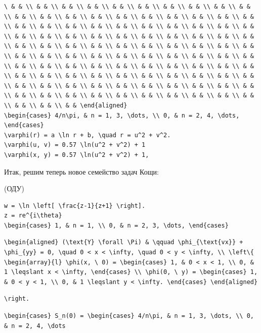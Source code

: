 \documentclass[
  ukrainian,
]{article}
\begin{document}
\begin{verbatim}
\ & & \\ & & \\ & & \\ & & \\ & & \\ & & \\ & & \\ & & \\ & & \\ & & \\ & & \\ & & \\ & & \\ & & \\ & & \\ & & \\ & & \\ & & \\ & & \\ & & \\ & & \\ & & \\ & & \\ & & \\ & & \\ & & \\ & & \\ & & \\ & & \\ & & \\ & & \\ & & \\ & & \\ & & \\ & & \\ & & \\ & & \\ & & \\ & & \\ & & \\ & & \\ & & \\ & & \\ & & \\ & & \\ & & \\ & & \\ & & \\ & & \\ & & \\ & & \\ & & \\ & & \\ & & \\ & & \\ & & \\ & & \\ & & \\ & & \\ & & \\ & & \\ & & \\ & & \\ & & \\ & & \\ & & \\ & & \\ & & \\ & & \\ & & \\ & & \\ & & \\ & & \\ & & \\ & & \\ & & \\ & & \\ & & \\ & & \\ & & \\ & & \\ & & \\ & & \\ & & \\ & & \\ & & \\ & & \\ & & \\ & & \\ & & \\ & & \\ & & \\ & & \\ & & \\ & & \\ & & \\ & & \\ & & \\ & & \\ & & \\ & & \\ & & \\ & & \end{aligned}
\begin{cases} 4/n\pi, & n = 1, 3, \dots, \\ 0, & n = 2, 4, \dots, \end{cases}
\varphi(r) = a \ln r + b, \quad r = u^2 + v^2.
\varphi(u, v) = 0.57 \ln(u^2 + v^2) + 1
\varphi(x, y) = 0.57 \ln(u^2 + v^2) + 1,
\end{verbatim}

Итак, решим теперь новое семейство задач Кощи:

(ОДУ)

\begin{verbatim}
w = \ln \left[ \frac{z-1}{z+1} \right].
z = re^{i\theta}
\begin{cases} 1, & n = 1, \\ 0, & n = 2, 3, \dots, \end{cases}
\end{verbatim}

\begin{verbatim}
\begin{aligned} (\text{Y} \forall \Pi) & \qquad \phi_{\text{vx}} + \phi_{yy} = 0, \quad 0 < x < \infty, \quad 0 < y < \infty, \\ \left\{ \begin{array}{l} \phi(x, \ 0) = \begin{cases} 1, & 0 < x < 1, \\ 0, & 1 \leqslant x < \infty, \end{cases} \\ \phi(0, \ y) = \begin{cases} 1, & 0 < y < 1, \\ 0, & 1 \leqslant y < \infty. \end{cases} \end{aligned}
\end{verbatim}

\begin{verbatim}
\right.
\end{verbatim}

\begin{verbatim}
\begin{cases} S_n(0) = \begin{cases} 4/n\pi, & n = 1, 3, \dots, \\ 0, & n = 2, 4, \dots
\end{verbatim}
\end{document}
